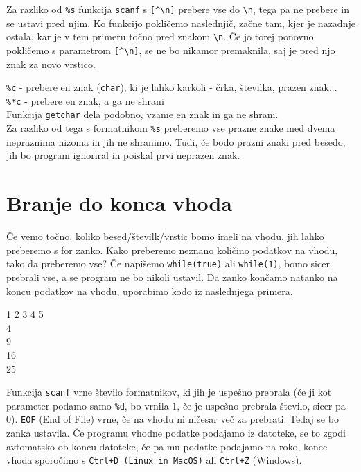 \documentclass{book}
\begin{document}
\begin{errors}
Za razliko od \verb+%s+ funkcija \verb+scanf+ s \verb+[^\n]+ prebere vse do \verb+\n+, tega pa ne prebere in se ustavi pred njim. Ko funkcijo pokličemo naslednjič, začne tam, kjer je nazadnje ostala, kar je v tem primeru točno pred znakom \verb+\n+. Če jo torej ponovno pokličemo s parametrom \verb+[^\n]+, se ne bo nikamor premaknila, saj je pred njo znak za novo vrstico. \\
\end{errors}

\verb+%c+ - prebere en znak (\verb+char+), ki je lahko karkoli - črka, številka, prazen znak... \\
\verb+%*c+ - prebere en znak, a ga ne shrani \\
Funkcija \verb+getchar+ dela podobno, vzame en znak in ga ne shrani. \\

Za razliko od tega s formatnikom \verb+%s+ preberemo vse prazne znake med dvema
nepraznima nizoma in jih ne shranimo. Tudi, če bodo prazni znaki pred besedo,
jih bo program ignoriral in poiskal prvi neprazen znak.

\section{Branje do konca vhoda}

Če vemo točno, koliko besed/številk/vrstic bomo imeli na vhodu, jih lahko
preberemo s for zanko. Kako preberemo neznano količino podatkov na vhodu, tako
da preberemo vse?
Če napišemo \verb+while(true)+ ali \verb+while(1)+, bomo sicer prebrali vse, a
se program ne bo nikoli ustavil.
Da zanko končamo natanko na koncu podatkov na vhodu, uporabimo kodo iz
naslednjega primera.

\newpage
\begin{examples}


\begin{inout}
1 2 3 4 5
\\4\\9\\16\\25
\end{inout}
\end{examples}

\vskip 0.15in
\noindent Funkcija \verb+scanf+ vrne število formatnikov, ki jih je uspešno
prebrala (če ji kot parameter podamo samo \verb+%d+, bo vrnila $1$, če je
uspešno prebrala število, sicer pa 0). \verb+EOF+ (End of File) vrne, če na
vhodu ni ničesar več za prebrati. Tedaj se bo zanka ustavila. Če programu
vhodne podatke podajamo iz datoteke, se to zgodi avtomatsko ob koncu datoteke,
če pa mu podatke podajamo na roko, konec vhoda sporočimo s
\verb-Ctrl+D (Linux in MacOS)- ali \verb-Ctrl+Z- (Windows).
\end{document}
